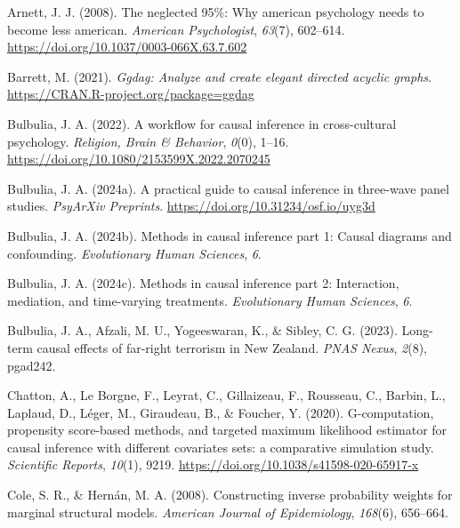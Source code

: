 \documentclass[
  single column]{article}
\newlength{\cslhangindent}
\newenvironment{CSLReferences}[2] %
 {\begin{list}{}{%
  \setlength{\itemindent}{0pt}
  \setlength{\leftmargin}{0pt}
  \setlength{\parsep}{0pt}
  \ifodd #1
   \setlength{\leftmargin}{\cslhangindent}
   \setlength{\itemindent}{-1\cslhangindent}
  \fi
  \setlength{\itemsep}{#2\baselineskip}}}
 {\end{list}}
\begin{document}
\label{refs}
\begin{CSLReferences}{1}{0}
Arnett, J. J. (2008). The neglected 95\%: Why american psychology needs
to become less american. \emph{American Psychologist}, \emph{63}(7),
602--614. \url{https://doi.org/10.1037/0003-066X.63.7.602}

Barrett, M. (2021). \emph{Ggdag: Analyze and create elegant directed
acyclic graphs}. \url{https://CRAN.R-project.org/package=ggdag}

Bulbulia, J. A. (2022). A workflow for causal inference in
cross-cultural psychology. \emph{Religion, Brain \& Behavior},
\emph{0}(0), 1--16. \url{https://doi.org/10.1080/2153599X.2022.2070245}

Bulbulia, J. A. (2024a). A practical guide to causal inference in
three-wave panel studies. \emph{PsyArXiv Preprints}.
\url{https://doi.org/10.31234/osf.io/uyg3d}

Bulbulia, J. A. (2024b). Methods in causal inference part 1: Causal
diagrams and confounding. \emph{Evolutionary Human Sciences}, \emph{6}.

Bulbulia, J. A. (2024c). Methods in causal inference part 2:
Interaction, mediation, and time-varying treatments. \emph{Evolutionary
Human Sciences}, \emph{6}.

Bulbulia, J. A., Afzali, M. U., Yogeeswaran, K., \& Sibley, C. G.
(2023). Long-term causal effects of far-right terrorism in {N}ew
{Z}ealand. \emph{PNAS Nexus}, \emph{2}(8), pgad242.

Chatton, A., Le Borgne, F., Leyrat, C., Gillaizeau, F., Rousseau, C.,
Barbin, L., Laplaud, D., Léger, M., Giraudeau, B., \& Foucher, Y.
(2020). G-computation, propensity score-based methods, and targeted
maximum likelihood estimator for causal inference with different
covariates sets: a comparative simulation study. \emph{Scientific
Reports}, \emph{10}(1), 9219.
\url{https://doi.org/10.1038/s41598-020-65917-x}

Cole, S. R., \& Hernán, M. A. (2008). Constructing inverse probability
weights for marginal structural models. \emph{American Journal of
Epidemiology}, \emph{168}(6), 656--664.


\end{CSLReferences}
\end{document}
